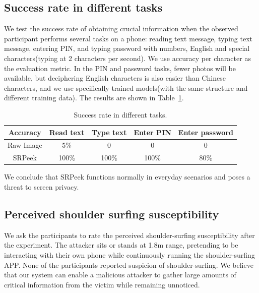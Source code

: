 \subsection{Success rate in different tasks}
We test the success rate of obtaining crucial information when the observed participant performs several tasks on a phone: reading text message, typing text message, entering PIN, and typing password with numbers, English and special characters(typing at 2 characters per second). We use accuracy per character as the evaluation metric. In the PIN and password tasks, fewer photos will be available, but deciphering English characters is also easier than Chinese characters, and we use specifically trained models(with the same structure and different training data). The results are shown in Table~\ref{table-task}.

\begin{table}[!t]
\centering
\caption{Success rate in different tasks.}
\label{table-task}
\begin{tabular}{@{}ccccc@{}}
	\toprule
Accuracy & Read text & Type text & Enter PIN & Enter password\\ \midrule
Raw Image & 5\% & 0 & 0 & 0\\
SRPeek & 100\% & 100\% & 100\% & 80\%\\ \bottomrule
\end{tabular}

\end{table}

We conclude that \textsf{SRPeek} functions normally in everyday scenarios and poses a threat to screen privacy.

\subsection{Perceived shoulder surfing susceptibility}
We ask the participants to rate the perceived shoulder-surfing susceptibility after the experiment. The attacker sits or stands at 1.8m range, pretending to be interacting with their own phone while continuously running the shoulder-surfing APP. None of the participants reported suspicion of shoulder-surfing. We believe that our system can enable a malicious attacker to gather large amounts of critical information from the victim while remaining unnoticed.




